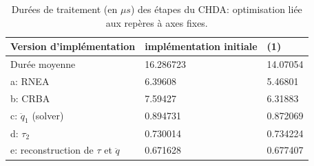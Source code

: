\documentclass[10pt]{beamer}
\begin{document}
\begin{frame}\scriptsize
  \begin{overlayarea}{\textwidth}{\textheight}

	\begin{flushleft}
  
	\begin{table}[H]
	\begin{center}
	\begin{tabular}[H]{|l|l|l|}
	\hline
	Version d'implémentation                   & implémentation initiale    & (1)      \\ \hline \hline
	Durée moyenne                              & 16.286723                  & 14.07054 \\
	a: RNEA                                    & 6.39608                    & 5.46801  \\
	b: CRBA                                    & 7.59427                    & 6.31883  \\
	c: $\ddot{q}_1$ (solver)                   & 0.894731                   & 0.872069 \\
	d: $\tau_2$                                & 0.730014                   & 0.734224 \\
	e: reconstruction de $\tau$ et $\ddot{q}$  & 0.671628                   & 0.677407 \\
	\hline
	\end{tabular}
	\caption[Table caption text]{Durées de traitement (en $\mu s$) des étapes du CHDA: optimisation liée aux repères à axes fixes.}
	\label{table:performancesOptimAxesFixes}
	\end{center}
	\end{table}
	

\end{flushleft}
\end{overlayarea}
\end{frame}
\end{document}
